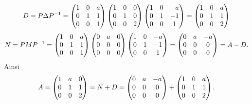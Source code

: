 {\begin{enumerate}
{$$D=P\Delta P^{-1}=\begin{pmatrix} 1&0&a\cr
0&1&1\cr
0&0&1\cr
\end{pmatrix}\begin{pmatrix} 1&0&0\cr
0&1&0\cr
0&0&2\cr
\end{pmatrix}\begin{pmatrix} 1&0&-a\cr
0&1&-1\cr
0&0&1\cr
\end{pmatrix}=\begin{pmatrix} 1&0&a\cr
0&1&1\cr
0&0&2\cr
\end{pmatrix}$$
$$N=PMP^{-1}=\begin{pmatrix} 1&0&a\cr
0&1&1\cr
0&0&1\cr
\end{pmatrix}\begin{pmatrix} 0&a&0\cr
0&0&0\cr
0&0&0\cr
\end{pmatrix}\begin{pmatrix} 1&0&-a\cr
0&1&-1\cr
0&0&1\cr
\end{pmatrix}=\begin{pmatrix} 0&a&-a\cr
0&0&0\cr
0&0&0\cr
\end{pmatrix}=A-D.$$
Ainsi
$$A=\begin{pmatrix} 1&a&0\cr
0&1&1\cr
0&0&2\cr
\end{pmatrix}=N+D=\begin{pmatrix} 0&a&-a\cr
0&0&0\cr
0&0&0\cr
\end{pmatrix}+\begin{pmatrix} 1&0&a\cr
0&1&1\cr
0&0&2\cr
\end{pmatrix}.$$}
\end{enumerate}
}
